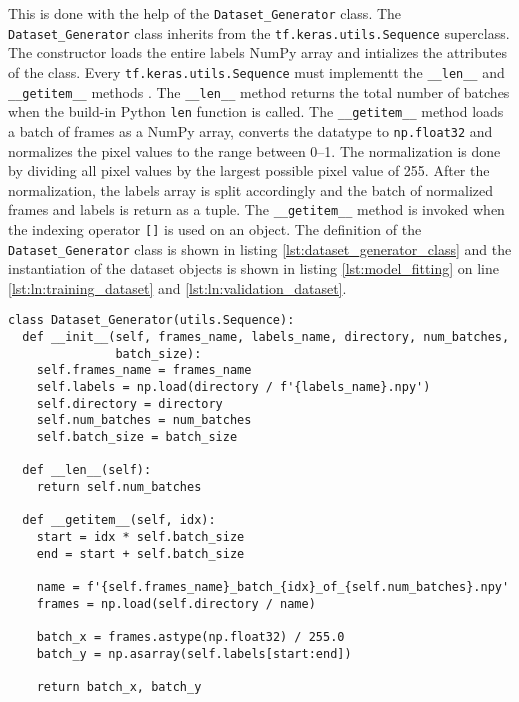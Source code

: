 This is done with the help of the \texttt{Dataset\_Generator} class.
The \texttt{Dataset\_Generator} class inherits from the \texttt{tf.keras.utils.Sequence} superclass.
The constructor loads the entire labels NumPy array and intializes the attributes of the class.
Every \texttt{tf.keras.utils.Sequence} must implementt the \texttt{\_\_len\_\_} and \texttt{\_\_getitem\_\_} methods \cite{training_arch_tf_keras_sequence}.
The \texttt{\_\_len\_\_} method returns the total number of batches when the build-in Python \texttt{len} function is called.
The \texttt{\_\_getitem\_\_} method loads a batch of frames as a NumPy array, converts the datatype to \texttt{np.float32} and normalizes the pixel values to the range between \numrange{0}{1}.
The normalization is done by dividing all pixel values by the largest possible pixel value of \num{255}.
After the normalization, the labels array is split accordingly and the batch of normalized frames and labels is return as a tuple.
The \texttt{\_\_getitem\_\_} method is invoked when the indexing operator \texttt{[]} is used on an object.
The definition of the \texttt{Dataset\_Generator} class is shown in listing \ref{lst:dataset_generator_class} and the instantiation of the dataset objects is shown in listing \ref{lst:model_fitting} on line \ref{lst:ln:training_dataset} and \ref{lst:ln:validation_dataset}.

\begin{lstlisting}[style=python, caption={\texttt{Dataset\_Generator} class}, label=lst:dataset_generator_class]
class Dataset_Generator(utils.Sequence):
  def __init__(self, frames_name, labels_name, directory, num_batches,
               batch_size):
    self.frames_name = frames_name
    self.labels = np.load(directory / f'{labels_name}.npy')
    self.directory = directory
    self.num_batches = num_batches
    self.batch_size = batch_size

  def __len__(self):
    return self.num_batches

  def __getitem__(self, idx):
    start = idx * self.batch_size
    end = start + self.batch_size

    name = f'{self.frames_name}_batch_{idx}_of_{self.num_batches}.npy'
    frames = np.load(self.directory / name)

    batch_x = frames.astype(np.float32) / 255.0
    batch_y = np.asarray(self.labels[start:end])

    return batch_x, batch_y
\end{lstlisting}

